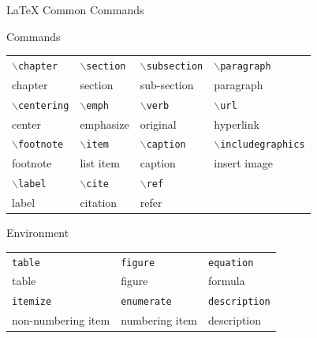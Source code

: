 \documentclass[UTF8]{ctexbeamer}
\def\cmd#1{\texttt{\color{red}\footnotesize $\backslash$#1}}
\def\env#1{\texttt{\color{blue}\footnotesize #1}}
\begin{document}
\begin{frame}[fragile]{\LaTeX{} Common Commands}
    \begin{exampleblock}{Commands}
        \centering
        \footnotesize
        \begin{tabular}{llll}
            \cmd{chapter} & \cmd{section} & \cmd{subsection} & \cmd{paragraph} \\
            chapter & section & sub-section & paragraph \\\hline
            \cmd{centering} & \cmd{emph} & \cmd{verb} & \cmd{url} \\
            center & emphasize & original & hyperlink \\\hline
            \cmd{footnote} & \cmd{item} & \cmd{caption} & \cmd{includegraphics} \\
            footnote & list item & caption & insert image \\\hline
            \cmd{label} & \cmd{cite} & \cmd{ref} \\
            label & citation & refer\\\hline
        \end{tabular}
    \end{exampleblock}
    \begin{exampleblock}{Environment}
        \centering
        \footnotesize
        \begin{tabular}{lll}
            \env{table} & \env{figure} & \env{equation}\\
            table & figure & formula \\\hline
            \env{itemize} & \env{enumerate} & \env{description}\\
            non-numbering item & numbering item & description \\\hline
        \end{tabular}
    \end{exampleblock}
\end{frame}
\end{document}
